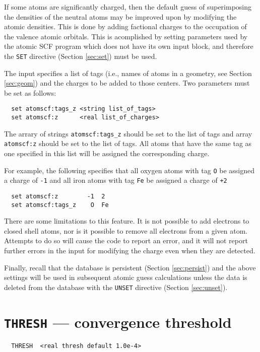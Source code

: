 If some atoms are significantly charged, then the default guess of
superimposing the densities of the neutral atoms may be improved upon
by modifying the atomic densities.  This is done by adding factional
charges to the occupation of the valence atomic orbitals.  This is
acomplished by setting parameters used by the atomic SCF program which
does not have its own input block, and therefore the \verb+SET+
directive (Section \ref{sec:set}) must be used.

The input specifies a list of tags (i.e., names of atoms in a
geometry, see Section \ref{sec:geom}) and the charges to be added to
those centers.  Two parameters must be set as follows:
\begin{verbatim}
  set atomscf:tags_z <string list_of_tags>
  set atomscf:z      <real list_of_charges>
\end{verbatim}

The arrary of strings \verb+atomscf:tags_z+ should be set to the list
of tags and array \verb+atomscf:z+ should be set to the list of tags.
All atoms that have the same tag as one specified in this list will be
assigned the corresponding charge.

For example, the following specifies that all oxygen atoms with tag
\verb+O+ be assigned a charge of \verb+-1+ and all iron atoms with tag
\verb+Fe+ be assigned a charge of \verb=+2=
\begin{verbatim}
  set atomscf:z        -1  2
  set atomscf:tags_z    O  Fe
\end{verbatim}

There are some limitations to this feature.  It is not possible to add
electrons to closed shell atoms, nor is it possible to remove all
electrons from a given atom.  Attempts to do so will cause the code to
report an error, and it will not report further errors in the input
for modifying the charge even when they are detected.

Finally, recall that the database is persistent (Section
\ref{sec:persist}) and the above settings will be used in subsequent
atomic guess calculations unless the data is deleted from the database
with the \verb+UNSET+ directive (Section \ref{sec:unset}).


\section{{\tt THRESH} --- convergence threshold}
\label{sec:thresh}

\begin{verbatim}
  THRESH  <real thresh default 1.0e-4>
\end{verbatim}

